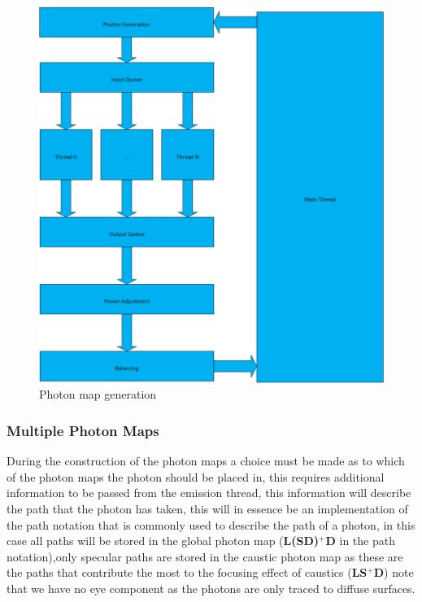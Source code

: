 \begin{figure}
\centering
\includegraphics{./images/photon_threading.png}
\caption{Photon map generation}
\label{fig:photon_generation}
\end{figure}

\subsubsection{Multiple Photon Maps}
During the construction of the photon maps a choice must be made as to which of the photon maps the photon
should be placed in, this requires additional information to be passed from the emission thread, this information
will describe the path that the photon has taken, this will in essence be an implementation of the path notation
that is commonly used to describe the path of a photon, in this case all paths will be stored in the global photon
map (\textbf{L(S\textbar D)$^+$D} in the path notation),only specular paths are stored in the caustic photon map
as these are the paths that contribute the most to the focusing effect of caustics (\textbf{LS$^+$D}) note that
we have no eye component as the photons are only traced to diffuse surfaces.


